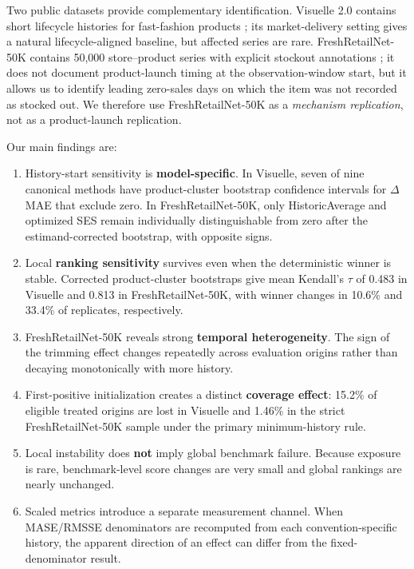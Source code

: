 Two public datasets provide complementary identification. Visuelle 2.0 contains short lifecycle histories for fast-fashion products \citep{skenderi2022visuelle}; its market-delivery setting gives a natural lifecycle-aligned baseline, but affected series are rare. FreshRetailNet-50K contains 50,000 store--product series with explicit stockout annotations \citep{wang2025freshretail}; it does not document product-launch timing at the observation-window start, but it allows us to identify leading zero-sales days on which the item was not recorded as stocked out. We therefore use FreshRetailNet-50K as a \emph{mechanism replication}, not as a product-launch replication.

Our main findings are:
\begin{enumerate}[leftmargin=1.5em]
    \item History-start sensitivity is \textbf{model-specific}. In Visuelle, seven of nine canonical methods have product-cluster bootstrap confidence intervals for $\Delta$MAE that exclude zero. In FreshRetailNet-50K, only HistoricAverage and optimized SES remain individually distinguishable from zero after the estimand-corrected bootstrap, with opposite signs.
    \item Local \textbf{ranking sensitivity} survives even when the deterministic winner is stable. Corrected product-cluster bootstraps give mean Kendall's $\tau$ of 0.483 in Visuelle and 0.813 in FreshRetailNet-50K, with winner changes in 10.6\% and 33.4\% of replicates, respectively.
    \item FreshRetailNet-50K reveals strong \textbf{temporal heterogeneity}. The sign of the trimming effect changes repeatedly across evaluation origins rather than decaying monotonically with more history.
    \item First-positive initialization creates a distinct \textbf{coverage effect}: 15.2\% of eligible treated origins are lost in Visuelle and 1.46\% in the strict FreshRetailNet-50K sample under the primary minimum-history rule.
    \item Local instability does \textbf{not} imply global benchmark failure. Because exposure is rare, benchmark-level score changes are very small and global rankings are nearly unchanged.
    \item Scaled metrics introduce a separate measurement channel. When MASE/RMSSE denominators are recomputed from each convention-specific history, the apparent direction of an effect can differ from the fixed-denominator result.
\end{enumerate}

